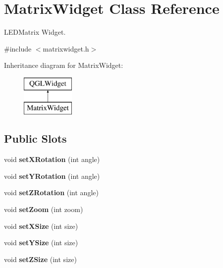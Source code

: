 \hypertarget{class_matrix_widget}{\section{Matrix\+Widget Class Reference}
\label{class_matrix_widget}
}


L\+E\+D\+Matrix Widget.  




{\ttfamily \#include $<$matrixwidget.\+h$>$}

Inheritance diagram for Matrix\+Widget\+:\begin{figure}[H]
\begin{center}
\leavevmode
\includegraphics[height=2.000000cm]{class_matrix_widget}
\end{center}
\end{figure}
\subsection*{Public Slots}
\begin{DoxyCompactItemize}
\item 
\hypertarget{class_matrix_widget_a5bad5bfa5cd3c567c0becbd2b1418214}{void {\bfseries set\+X\+Rotation} (int angle)}\label{class_matrix_widget_a5bad5bfa5cd3c567c0becbd2b1418214}

\item 
\hypertarget{class_matrix_widget_a5079e971ba09d29a296e1794a83a962f}{void {\bfseries set\+Y\+Rotation} (int angle)}\label{class_matrix_widget_a5079e971ba09d29a296e1794a83a962f}

\item 
\hypertarget{class_matrix_widget_a874af5a3121de026d6d6d1d1e6dcbd3a}{void {\bfseries set\+Z\+Rotation} (int angle)}\label{class_matrix_widget_a874af5a3121de026d6d6d1d1e6dcbd3a}

\item 
\hypertarget{class_matrix_widget_a281f2b0b02858ce8f02af9acdb1101a6}{void {\bfseries set\+Zoom} (int zoom)}\label{class_matrix_widget_a281f2b0b02858ce8f02af9acdb1101a6}

\item 
\hypertarget{class_matrix_widget_a556d5f41bc0558be7da8d9b9e88beda4}{void {\bfseries set\+X\+Size} (int size)}\label{class_matrix_widget_a556d5f41bc0558be7da8d9b9e88beda4}

\item 
\hypertarget{class_matrix_widget_a0135c4b640238be89682b030b9f1087c}{void {\bfseries set\+Y\+Size} (int size)}\label{class_matrix_widget_a0135c4b640238be89682b030b9f1087c}

\item 
\hypertarget{class_matrix_widget_a6a1daa02d97ff9207c1fa8b0d22033d7}{void {\bfseries set\+Z\+Size} (int size)}\label{class_matrix_widget_a6a1daa02d97ff9207c1fa8b0d22033d7}

\end{DoxyCompactItemize}
